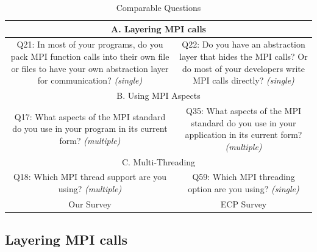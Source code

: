 \documentclass[conference,10pt,letterpaper]{IEEEtran}
\begin{document}
\begin{table}[htb]%
\begin{center}%
  \caption{Comparable Questions}%
  \label{tab:comparable-questions}%
  \begin{tabular}[t]{c|c}
    \hline
    \multicolumn{2}{c}{A. Layering MPI calls} \\
    \hline
    \begin{minipage}[t]{0.45\hsize}
      Q21: In most of your programs, do you pack MPI function calls into
      their own file or files to have your own abstraction layer for
      communication?  {\it(single)}
    \end{minipage}
    &
    \begin{minipage}[t]{0.45\hsize}
      Q22: Do you have an abstraction layer that hides the MPI calls? Or do
      most of your developers write MPI calls directly? {\it(single)}
    \end{minipage}
    \\
    \hline
    \multicolumn{2}{c}{B. Using MPI Aspects} \\
    \hline
    \begin{minipage}[t]{0.45\hsize}
      Q17: What aspects of the MPI standard do you use in your program in its
      current form? {\it(multiple)}
    \end{minipage}
    &
    \begin{minipage}[t]{0.45\hsize}
      Q35: What aspects of the MPI standard do you use in your application in
      its current form? {\it(multiple)}
    \end{minipage}
    \\
    \hline
    \multicolumn{2}{c}{C. Multi-Threading} \\
    \hline
    \begin{minipage}[t]{0.45\hsize}
      Q18: Which MPI thread support are you using? {\it(multiple)}
    \end{minipage}
    &
    \begin{minipage}[t]{0.45\hsize}
      Q59: Which MPI threading option are you using? {\it(single)}
    \end{minipage}
    \\
    \hline
    Our Survey & ECP Survey \\
    \hline
  \end{tabular}%
\end{center}%
\end{table}%

\subsection{Layering MPI calls}
\end{document}
